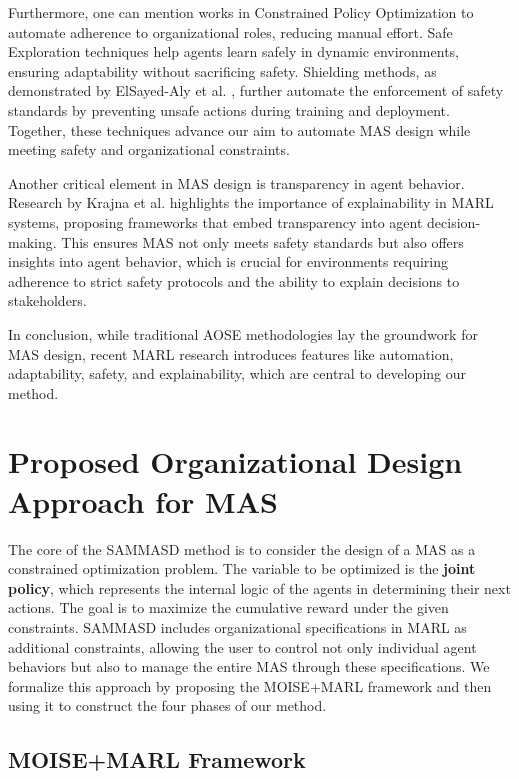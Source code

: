 \documentclass[sigconf,anonymous]{aamas}
\begin{document}
Furthermore, one can mention works in Constrained Policy Optimization \cite{zhao2024} to automate adherence to organizational roles, reducing manual effort. Safe Exploration techniques \cite{melcer2024} help agents learn safely in dynamic environments, ensuring adaptability without sacrificing safety. Shielding methods, as demonstrated by ElSayed-Aly et al. \cite{elsayed2021}, further automate the enforcement of safety standards by preventing unsafe actions during training and deployment. Together, these techniques advance our aim to automate MAS design while meeting safety and organizational constraints.

Another critical element in MAS design is transparency in agent behavior. Research by Krajna et al. \cite{krajna2022} highlights the importance of explainability in MARL systems, proposing frameworks that embed transparency into agent decision-making. This ensures MAS not only meets safety standards but also offers insights into agent behavior, which is crucial for environments requiring adherence to strict safety protocols and the ability to explain decisions to stakeholders.

In conclusion, while traditional AOSE methodologies lay the groundwork for MAS design, recent MARL research introduces features like automation, adaptability, safety, and explainability, which are central to developing our method.


\section{Proposed Organizational Design Approach for MAS}
\label{sec:sammasd_presentation}

The core of the SAMMASD method is to consider the design of a MAS as a constrained optimization problem. The variable to be optimized is the \textbf{joint policy}, which represents the internal logic of the agents in determining their next actions. The goal is to maximize the cumulative reward under the given constraints. SAMMASD includes organizational specifications in MARL as additional constraints, allowing the user to control not only individual agent behaviors but also to manage the entire MAS through these specifications. We formalize this approach by proposing the MOISE+MARL framework and then using it to construct the four phases of our method.

\subsection{\textbf{MOISE+MARL Framework}}
\end{document}

